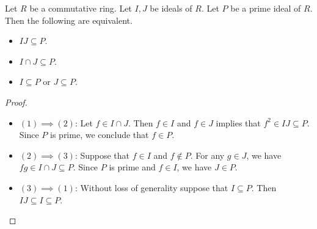 \documentclass[a4paper]{article}
\begin{document}
\begin{lmm}{}{} Let $R$ be a commutative ring. Let $I,J$ be ideals of $R$. Let $P$ be a prime ideal of $R$. Then the following are equivalent. 
\begin{itemize}
\item $IJ\subseteq P$. 
\item $I\cap J\subseteq P$. 
\item $I\subseteq P$ or $J\subseteq P$. 
\end{itemize} \tcbline
\begin{proof}~\\
\begin{itemize}
\item $(1)\implies(2)$: Let $f\in I\cap J$. Then $f\in I$ and $f\in J$ implies that $f^2\in IJ\subseteq P$. Since $P$ is prime, we conclude that $f\in P$. 
\item $(2)\implies(3)$: Suppose that $f\in I$ and $f\notin P$. For any $g\in J$, we have $fg\in I\cap J\subseteq P$. Since $P$ is prime and $f\in I$, we have $J\in P$. 
\item $(3)\implies(1)$: Without loss of generality suppose that $I\subseteq P$. Then $IJ\subseteq I\subseteq P$. 
\end{itemize}
\end{proof}
\end{lmm}
\end{document}
